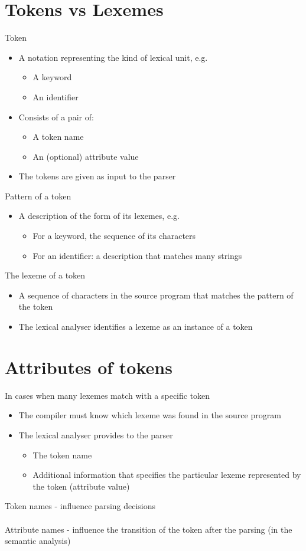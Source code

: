 \documentclass{article}[18pt]
\begin{document}
\section{Tokens vs Lexemes}
Token
\begin{itemize}
	\item A notation representing the kind of lexical unit, e.g.
	\begin{itemize}
		\item A keyword
		\item An identifier
	\end{itemize}
	\item Consists of a pair of:
	\begin{itemize}
		\item A token name
		\item An (optional) attribute value
	\end{itemize}
	\item The tokens are given as input to the parser
\end{itemize}
Pattern of a token
\begin{itemize}
	\item A description of the form of its lexemes, e.g.
	\begin{itemize}
		\item For a keyword, the sequence of its characters
		\item For an identifier: a description that matches many strings
	\end{itemize}
\end{itemize}
The lexeme of a token
\begin{itemize}
	\item A sequence of characters in the source program that matches the pattern of the token
	\item The lexical analyser identifies a lexeme as an instance of a token
\end{itemize}
\section{Attributes of tokens}
In cases when many lexemes match with a specific token
\begin{itemize}
	\item The compiler must know which lexeme was found in the source program
	\item The lexical analyser provides to the parser
	\begin{itemize}
		\item The token name
		\item Additional information that specifies the particular lexeme represented by the token (attribute value)
	\end{itemize}
\end{itemize}
Token names - influence parsing decisions\\
\\
Attribute names - influence the transition of the token after the parsing (in the semantic analysis)
\end{document}
